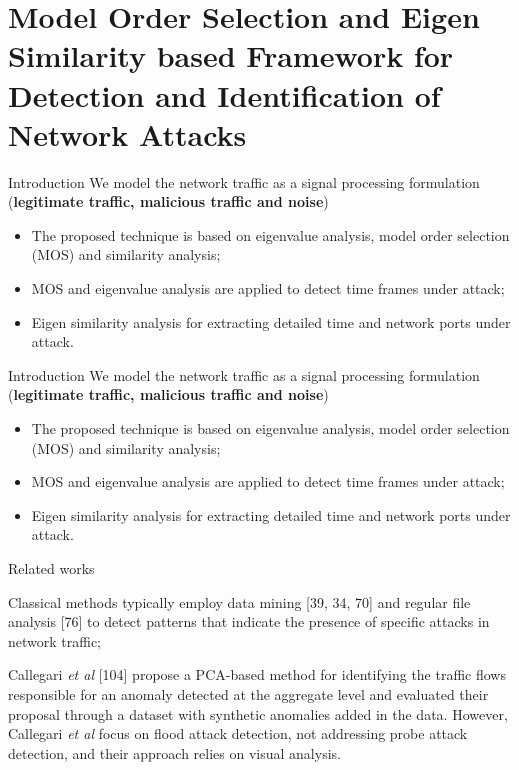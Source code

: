 \documentclass[newPxFont, numfooter, sectionpages]{beamer}
\begin{document}
\section{Model Order Selection and Eigen Similarity based Framework for Detection and Identification of Network Attacks}
\begin{frame}[c]{Introduction}
	We model the network traffic as a signal processing formulation (\textbf{legitimate traffic, malicious traffic and noise})
	\begin{itemize}
		\item The proposed technique is based on eigenvalue analysis, model order selection (MOS) and similarity analysis;
		\item MOS and eigenvalue analysis are applied to detect time frames under attack;
		\item Eigen similarity analysis for extracting detailed time and network ports under attack. 
	\end{itemize}
\end{frame}
\begin{frame}[c]{Introduction}
	We model the network traffic as a signal processing formulation (\textbf{legitimate traffic, malicious traffic and noise})
	\begin{itemize}
		\item The proposed technique is based on eigenvalue analysis, model order selection (MOS) and similarity analysis;
		\item MOS and eigenvalue analysis are applied to detect time frames under attack;
		\item Eigen similarity analysis for extracting detailed time and network ports under attack. 
	\end{itemize}
\end{frame}
\begin{frame}[c]{Related works}
	
	Classical methods typically employ data mining [39, 34, 70] and regular file analysis [76] to detect patterns that indicate the presence of specific attacks in network traffic;

	Callegari \emph{et al} [104] propose a PCA-based method for identifying the traffic flows responsible for an anomaly detected at the aggregate level and evaluated their proposal through a dataset with synthetic anomalies added in the data. However, Callegari \emph{et al} focus on flood attack detection, not addressing probe attack detection, and their approach relies on visual analysis. 

\end{frame}
\end{document}
